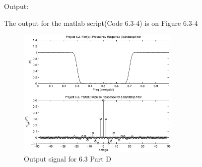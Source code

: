 {\LARGE Output:}\newline

The output for the matlab script(Code 6.3-4) is on Figure 6.3-4 \\

\begin{figure}[h!]
  \centering
    \includegraphics[width=0.7\textwidth]{Part2/Output/Figures/proj63PartD.eps}
  \caption{Output signal for 6.3 Part D}
\end{figure}
\pagebreak
